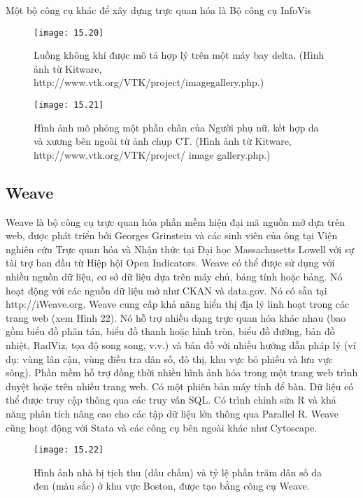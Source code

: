 \documentclass[13pt]{scrartcl} %
\begin{document}
Một bộ công cụ khác để xây dựng trực quan hóa là Bộ công cụ InfoVis

\begin{figure}[!ht]
    \centering
    \texttt{[image: 15.20]}
    \caption{Luồng không khí được mô tả hợp lý trên một máy bay delta. (Hình ảnh từ Kitware, http://www.vtk.org/VTK/project/imagegallery.php.)}
\end{figure}

\begin{figure}[!ht]
    \centering
    \texttt{[image: 15.21]}
    \caption{Hình ảnh mô phỏng một phần chân của Người phụ nữ, kết hợp da và xương bên ngoài từ ảnh chụp CT. (Hình ảnh từ Kitware, http://www.vtk.org/VTK/project/ image gallery.php.)}
\end{figure}

\subsection{Weave}

Weave là bộ công cụ trực quan hóa phần mềm hiện đại mã nguồn mở  dựa trên web, được phát triển bởi Georges Grinstein và các sinh viên của ông tại Viện nghiên cứu Trực quan hóa và Nhận thức tại Đại học Massachusetts Lowell với sự tài trợ ban đầu từ Hiệp hội Open Indicators. Weave có thể được sử dụng với nhiều nguồn dữ liệu, cơ sở dữ liệu dựa trên máy chủ, bảng tính hoặc bảng. Nó hoạt động với các nguồn dữ liệu mở như CKAN và data.gov. Nó có sẵn tại http://iWeave.org. Weave cung cấp khả năng hiển thị địa lý linh hoạt trong các trang web (xem Hình 22). Nó hỗ trợ nhiều dạng trực quan hóa khác nhau (bao gồm biểu đồ phân tán, biểu đồ thanh hoặc hình tròn, biểu đồ đường, bản đồ nhiệt, RadViz, tọa độ song song, v.v.) và bản đồ với nhiều hướng dẫn pháp lý (ví dụ: vùng lân cận, vùng điều tra dân số, đô thị, khu vực bỏ phiếu và lưu vực sông). Phần mềm hỗ trợ đồng thời nhiều hình ảnh hóa trong một trang web trình duyệt hoặc trên nhiều trang web. Có một phiên bản máy tính để bàn. Dữ liệu có thể được truy cập thông qua các truy vấn SQL. Có trình chỉnh sửa R và khả năng phân tích nâng cao cho các tập dữ liệu lớn thông qua Parallel R. Weave cũng hoạt động với Stata và các công cụ bên ngoài khác như Cytoscape.

\begin{figure}[!ht]
    \centering
    \texttt{[image: 15.22]}
    \caption{Hình ảnh nhà bị tịch thu (dấu chấm) và tỷ lệ phần trăm dân số da đen (màu sắc) ở khu vực Boston, được tạo bằng công cụ Weave.}
\end{figure}
\end{document}
